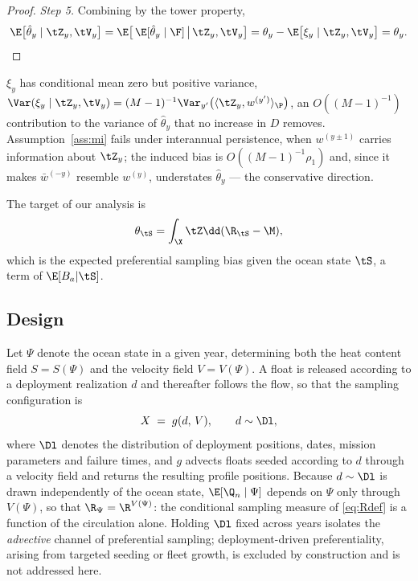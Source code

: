 \begin{proof}
\emph{Step 5.} Combining by the tower property,
\begin{equation}
  \E\big[\hat\theta_y \mid \tZ_y, \tV_y\big]
  = \E\big[\, \E[\hat\theta_y \mid \F] \,\big|\, \tZ_y, \tV_y\big]
  = \theta_y - \E\big[\xi_y \mid \tZ_y, \tV_y\big]
  = \theta_y . \qedhere
\end{equation}
\end{proof}

\begin{remark}
$\xi_y$ has conditional mean zero but positive variance,
$\Var(\xi_y \mid \tZ_y,\tV_y) = (M-1)^{-1}\Var_{y'}\big(\langle \tZ_y, w^{(y')}\rangle_\P\big)$,
an $O((M-1)^{-1})$ contribution to the variance of $\hat\theta_y$ that no increase
in $D$ removes. Assumption~\ref{ass:mi} fails under interannual persistence, when
$w^{(y\pm1)}$ carries information about $\tZ_y$; the induced bias is
$O((M-1)^{-1}\rho_1)$ and, since it makes $\bar w^{(-y)}$ resemble $w^{(y)}$,
understates $\hat\theta_y$ --- the conservative direction.
\end{remark}


\newpage

The target of our analysis is 
\begin{equation}
  \theta_{\tS} = \int_{\X} \tZ\dd(\R_{\tS} - \M),
\end{equation}
which is the expected preferential sampling bias given the ocean state $\tS$, a term of $\E[B_a | \tS]$.

\subsection{Design}

Let $\Psi$ denote the ocean state in a given year, determining both the heat
content field $S = S(\Psi)$ and the velocity field $V = V(\Psi)$. A float is
released according to a deployment realization $d$ and thereafter follows the
flow, so that the sampling configuration is
\begin{equation}
  \label{eq:gmap}
  X \;=\; g(d,\, V), \qquad d \sim \Dl ,
\end{equation}
where $\Dl$ denotes the distribution of deployment positions, dates, mission
parameters and failure times, and $g$ advects floats seeded according to $d$
through a velocity field and returns the resulting profile positions. Because
$d \sim \Dl$ is drawn independently of the ocean state, $\E[\Q_n \mid \Psi]$
depends on $\Psi$ only through $V(\Psi)$, so that $\R_\Psi = \R^{V(\Psi)}$: the
conditional sampling measure of \eqref{eq:Rdef} is a function of the circulation
alone. Holding $\Dl$ fixed across years isolates the \emph{advective} channel of
preferential sampling; deployment-driven preferentiality, arising from targeted
seeding or fleet growth, is excluded by construction and is not addressed here.


